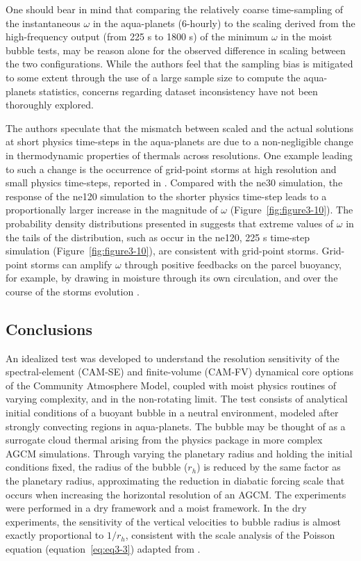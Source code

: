 One should bear in mind that comparing the relatively coarse time-sampling of the instantaneous $\omega$ in the aqua-planets (6-hourly) to the scaling derived from the high-frequency output (from 225 s to 1800 s) of the minimum $\omega$ in the moist bubble tests, may be reason alone for the observed difference in scaling between the two configurations. While the authors feel that the sampling bias is mitigated to some extent through the use of a large sample size to compute the aqua-planets statistics, concerns regarding dataset inconsistency have not been thoroughly explored.

The authors speculate that the mismatch between scaled and the actual solutions at short physics time-steps in the aqua-planets are due to a non-negligible change in thermodynamic properties of thermals across resolutions. One example leading to such a change is the occurrence of grid-point storms at high resolution and small physics time-steps, reported in \cite{W2013QJRMS}. Compared with the ne30 simulation, the response of the ne120 simulation to the shorter physics time-step leads to a proportionally larger increase in the magnitude of $\omega$ (Figure~\ref{fig:figure3-10}). The probability density distributions presented in \cite{W2013QJRMS} suggests that extreme values of $\omega$ in the tails of the distribution, such as occur in the ne120, 225 s time-step simulation (Figure~\ref{fig:figure3-10}), are consistent with grid-point storms. Grid-point storms can amplify $\omega$ through positive feedbacks on the parcel buoyancy, for example, by drawing in moisture through its own circulation, and over the course of the storms evolution \citep{W2013QJRMS}.

\subsection{Conclusions}
An idealized test was developed to understand the resolution sensitivity of the spectral-element (CAM-SE) and finite-volume (CAM-FV) dynamical core options of the Community Atmosphere Model, coupled with moist physics routines of varying complexity, and in the non-rotating limit. The test consists of analytical initial conditions of a buoyant bubble in a neutral environment, modeled after strongly convecting regions in aqua-planets. The bubble may be thought of as a surrogate cloud thermal arising from the physics package in more complex AGCM simulations. Through varying the planetary radius and holding the initial conditions fixed, the radius of the bubble ($r_h$) is reduced by the same factor as the planetary radius, approximating the reduction in diabatic forcing scale that occurs when increasing the horizontal resolution of an AGCM. The experiments were performed in a dry framework and a moist framework. In the dry experiments, the sensitivity of the vertical velocities to bubble radius is almost exactly proportional to $1/r_h$, consistent with the scale analysis of the Poisson equation (equation~\ref{eq:eq3-3}) adapted from \cite{JR2016QJRMS}.

